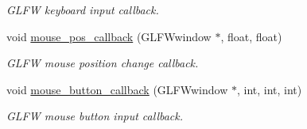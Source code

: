\begin{DoxyCompactItemize}
\begin{DoxyCompactList}\small\item\em G\+L\+FW keyboard input callback. \end{DoxyCompactList}\item 
void \hyperlink{class_game_a43bf11792029b86e8a33f58a64c8d241}{mouse\+\_\+pos\+\_\+callback} (G\+L\+F\+Wwindow $\ast$, float, float)\hypertarget{class_game_a43bf11792029b86e8a33f58a64c8d241}{}\label{class_game_a43bf11792029b86e8a33f58a64c8d241}

\begin{DoxyCompactList}\small\item\em G\+L\+FW mouse position change callback. \end{DoxyCompactList}\item 
void \hyperlink{class_game_a6b75ba24ce7f9e7d2d9af45dae72e0dc}{mouse\+\_\+button\+\_\+callback} (G\+L\+F\+Wwindow $\ast$, int, int, int)\hypertarget{class_game_a6b75ba24ce7f9e7d2d9af45dae72e0dc}{}\label{class_game_a6b75ba24ce7f9e7d2d9af45dae72e0dc}

\begin{DoxyCompactList}\small\item\em G\+L\+FW mouse button input callback. \end{DoxyCompactList}\end{DoxyCompactItemize}
